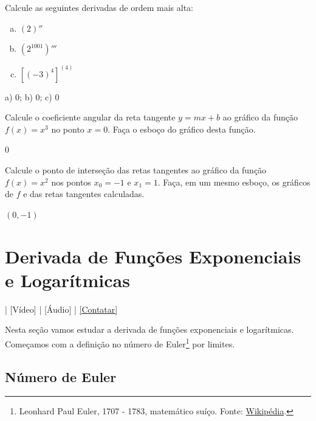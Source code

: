 \begin{exer}
  Calcule as seguintes derivadas de ordem mais alta:
  \begin{enumerate}[a)]
  \item $(2)''$
  \item $\left(2^{1001}\right)'''$
  \item $\left[(-3)^{4}\right]^{(4)}$
  \end{enumerate}
\end{exer}
\begin{resp}
  a) $0$; b) $0$; c) $0$
\end{resp}

\begin{exer}
  Calcule o coeficiente angular da reta tangente $y = mx + b$ ao gráfico da função $f(x) = x^3$ no ponto $x = 0$. Faça o esboço do gráfico desta função.
\end{exer}
\begin{resp}
  $0$
\end{resp}

\begin{exer}
  Calcule o ponto de interseção das retas tangentes ao gráfico da função $f(x) = x^2$ nos pontos $x_0=-1$ e $x_1 = 1$. Faça, em um mesmo esboço, os gráficos de $f$ e das retas tangentes calculadas.
\end{exer}
\begin{resp}
  $(0, -1)$
\end{resp}

\section{Derivada de Funções Exponenciais e Logarítmicas}\label{cap_deriv_sec_funexplog}

\begin{flushright}
  [YouTube] | [Vídeo] | [Áudio] | \href{https://phkonzen.github.io/notas/contato.html}{[Contatar]}
\end{flushright}

Nesta seção vamos estudar a derivada de funções exponenciais e logarítmicas. Começamos com a definição no número de Euler\footnote{Leonhard Paul Euler, 1707 - 1783, matemático suíço. Fonte: \href{https://pt.wikipedia.org/wiki/Leonhard_Euler}{Wikipédia}.} por limites.

\subsection{Número de Euler}

